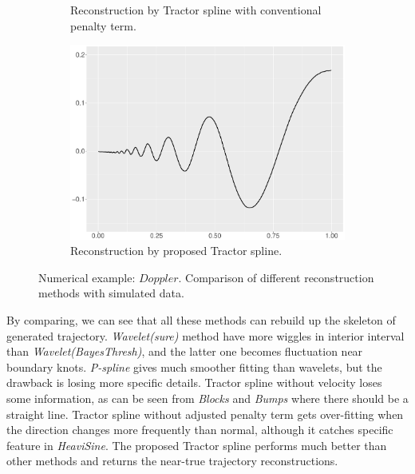 \begin{figure}
\begin{subfigure}{0.45\textwidth}
    \caption{Reconstruction by Tractor spline with conventional penalty term.}
    \end{subfigure}
    \begin{subfigure}{0.45\textwidth}
    \centering
    \includegraphics[width=\linewidth,height=0.45\textwidth]{Chapters/02TractorSplineTheory/plot/ggplot/ggDopplerTractor.pdf}
    \caption{Reconstruction by proposed Tractor spline.}
    \end{subfigure}
\caption{Numerical example: $\textit{Doppler}$. Comparison of different reconstruction methods with simulated data.}\label{num4}
 \end{figure}

By comparing, we can see that all these methods can rebuild up the skeleton of generated trajectory. \textit{Wavelet(sure)} method have more wiggles in interior interval than \textit{Wavelet(BayesThresh)}, and the latter one becomes fluctuation near boundary knots. \textit{P-spline} gives much smoother fitting than wavelets, but the drawback is losing more specific details. Tractor spline without velocity loses some information, as can be seen from \textit{Blocks} and \textit{Bumps} where there should be a straight line. Tractor spline without adjusted penalty term gets over-fitting when the direction changes more frequently than normal, although it catches specific feature in \textit{HeaviSine}. The proposed Tractor spline performs much better than other methods and returns the near-true trajectory reconstructions.  





